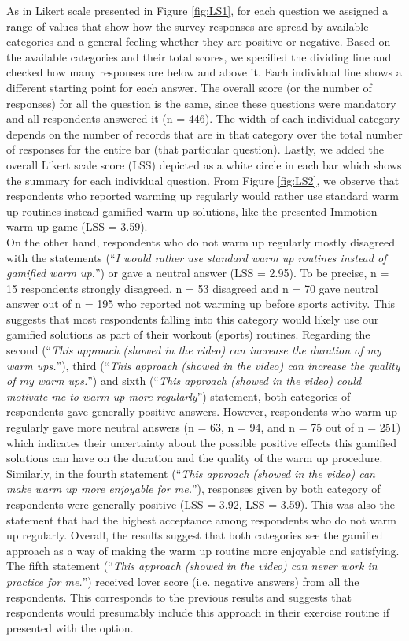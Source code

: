 As in Likert scale presented in Figure \ref{fig:LS1}, for each question we assigned a range of values that show how the survey responses are spread by available categories and a general feeling whether they are positive or negative. Based on the available categories and their total scores, we specified the dividing line and checked how many responses are below and above it. Each individual line shows a different starting point for each answer. The overall score (or the number of responses) for all the question is the same, since these questions were mandatory and all respondents answered it (n = 446). The width of each individual category depends on the number of records that are in that category over the total number of responses for the entire bar (that particular question). Lastly, we added the overall Likert scale score (LSS) depicted as a white circle in each bar which shows the summary for each individual question. From Figure \ref{fig:LS2}, we observe that respondents who reported warming up regularly would rather use standard warm up routines instead gamified warm up solutions, like the presented Immotion warm up game (LSS = 3.59). \\On the other hand, respondents who do not warm up regularly mostly disagreed with the statements (``\textit{I would rather use standard warm up routines instead of gamified warm up.}'') or gave a neutral answer (LSS = 2.95). To be precise, n = 15 respondents strongly disagreed, n = 53 disagreed and n = 70 gave neutral answer out of n = 195 who reported not warming up before sports activity. This suggests that most respondents falling into this category would likely use our gamified solutions as part of their workout (sports) routines. Regarding the second (``\textit{This approach (showed in the video) can increase the duration of my warm ups.}''), third (``\textit{This approach (showed in the video) can increase the quality of my warm ups.}'') and sixth (``\textit{This approach (showed in the video) could motivate me to warm up more regularly}'') statement, both categories of respondents gave generally positive answers. However, respondents who warm up regularly gave more neutral answers (n = 63, n = 94, and n = 75 out of n = 251) which indicates their uncertainty about the possible positive effects this gamified solutions can have on the duration and the quality of the warm up procedure.  Similarly, in the fourth statement (``\textit{This approach (showed in the video) can make warm up more enjoyable for me.}''), responses given by both category of respondents were generally positive (LSS = 3.92, LSS = 3.59). This was also the statement that had the highest acceptance among respondents who do not warm up regularly. Overall, the results suggest that both categories see the gamified approach as a way of making the warm up routine more enjoyable and satisfying. The fifth statement (``\textit{This approach (showed in the video) can never work in practice for me.}'') received lover score (i.e. negative answers) from all the respondents. This corresponds to the previous results and suggests that respondents would presumably include this approach in their exercise routine if presented with the option.
